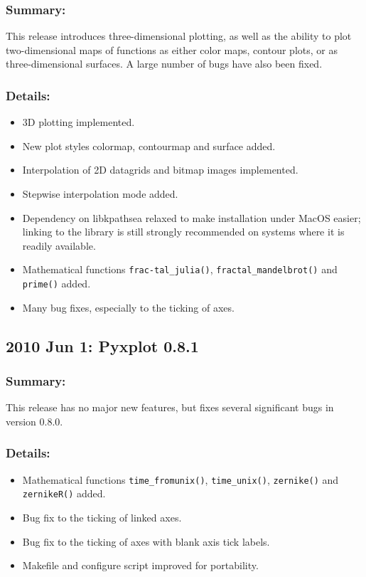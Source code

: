 \subsubsection*{Summary:}

This release introduces three-dimensional plotting, as well as the ability to plot two-dimensional maps of functions as either color maps, contour plots, or as three-dimensional surfaces. A large number of bugs have also been fixed.

\subsubsection*{Details:}

\begin{itemize}
\item 3D plotting implemented.
\item New plot styles colormap, contourmap and surface added.
\item Interpolation of 2D datagrids and bitmap images implemented.
\item Stepwise interpolation mode added.
\item Dependency on libkpathsea relaxed to make installation under MacOS easier; linking to the library is still strongly recommended on systems where it is readily available.
\item Mathematical functions {\tt frac-tal\_\-julia()}, {\tt frac\-tal\_\-man\-del\-brot()} and {\tt prime()} added.
\item Many bug fixes, especially to the ticking of axes.
\end{itemize}

\subsection*{2010 Jun 1: Pyxplot 0.8.1}

\subsubsection*{Summary:}

This release has no major new features, but fixes several significant bugs in version 0.8.0.

\subsubsection*{Details:}

\begin{itemize}
\item Mathematical functions {\tt time\_\-from\-unix()}, {\tt time\_\-unix()}, {\tt zernike()} and {\tt zernikeR()} added.
\item Bug fix to the ticking of linked axes.
\item Bug fix to the ticking of axes with blank axis tick labels.
\item Makefile and configure script improved for portability.
\end{itemize}

